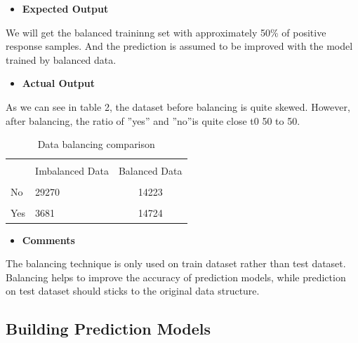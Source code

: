    		\begin{itemize}
   		\item \textbf{Expected Output}
   		\end{itemize}
   		 \noindent We will get the balanced traininng set with approximately 50\% of positive response samples. And the prediction is assumed to be improved with the model trained by balanced data.  
   	  	\begin{itemize}
   		\item \textbf{Actual Output}
   		\end{itemize}
   	\noindent As we can see in table 2, the dataset before balancing is quite skewed. However, after balancing, the ratio of ''yes'' and ''no''is quite close t0 50 to 50. 
   	  \begin{center}
   		\begin{table}[!htbp]
   			\centering  
   			\begin{tabular}{llc}
   				\hline
   				\hline\\[-1.8ex]

   				 & Imbalanced Data & Balanced Data \\
   				\hline \\[-1.8ex] 
   				No &  29270 & 14223  \\ 
   				\hline \\[-1.8ex] 
   				Yes&  3681 & 14724 \\ 
   				\hline
   				\hline
   			\end{tabular}  
   			\caption{Data balancing comparison} 
   		\end{table}
   	\end{center}
    
   	   	\begin{itemize}
   	   	\item \textbf{Comments}
   	   \end{itemize}
      The balancing technique is only used on train dataset rather than test dataset. Balancing helps to improve the accuracy of prediction models, while prediction on test dataset should sticks to the original data structure. 
   	  
       \subsection{Building Prediction Models}
